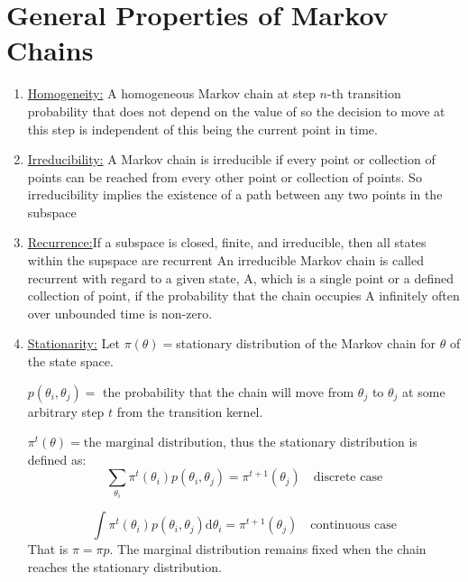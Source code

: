\documentclass[lecture,12pt,]{pcms-l}
\numberwithin{section}{chapter}
\numberwithin{equation}{chapter}
\theoremstyle{plain}
\theoremstyle{definition}
\theoremstyle{definition}
\begin{document}
\section{General Properties of Markov Chains}
\begin{enumerate}
\item \underline{Homogeneity:} A homogeneous Markov chain at step $n$-th transition probability that does not depend on the value of so the decision to move at this step is independent of this being the current point in time.
\item \underline{Irreducibility:} A Markov chain is irreducible if every point or collection of points can be reached from every other point or collection of points. So irreducibility implies the existence of a path between any two points in the subspace
\item \underline{Recurrence:}If a subspace is closed, finite, and irreducible, then all states within the supspace are recurrent An irreducible Markov chain is called recurrent with regard to a given state, A, which is a single point or a defined collection of point, if the probability that the chain occupies A infinitely often over unbounded time is non-zero. 
\item \underline{Stationarity:} Let $\pi(\theta)=$stationary distribution of the Markov 
chain for $\theta$ of the state space.

$p(\theta_i,\theta_j)=$ the probability that the chain will move from $\theta_j$ to $\theta_j$ at some arbitrary step $t$ from the transition kernel.

$\pi^t(\theta)=\text{the marginal distribution}$, thus the stationary distribution is defined as:
\begin{equation}
\sum_{\theta_i}\pi^t(\theta_i)p(\theta_i,\theta_j)=\pi^{t+1}(\theta_j)\quad \text{discrete case}
\end{equation}

\begin{equation}
\int \pi^t(\theta_i)p(\theta_i,\theta_j) \mathrm{d} \theta_i=\pi^{t+1}(\theta_j)\quad \text{continuous case}
\end{equation}
That is $\pi=\pi p$. The marginal distribution remains fixed when the chain reaches the stationary distribution.


\end{enumerate}
\end{document}
